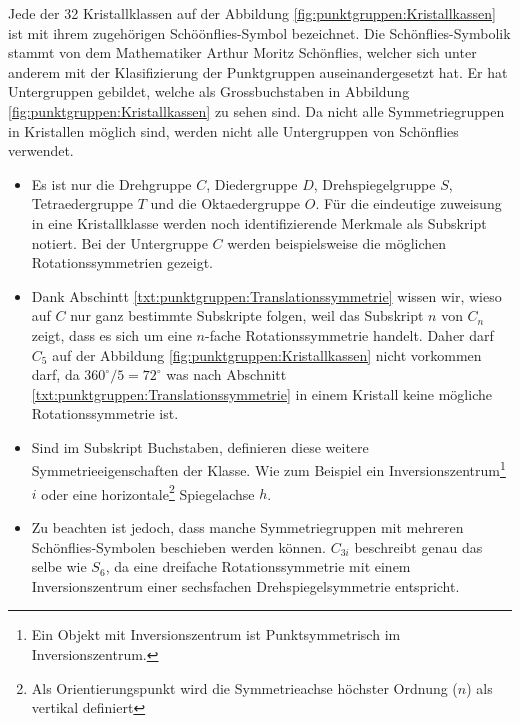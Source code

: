 Jede der 32 Kristallklassen auf der Abbildung \ref{fig:punktgruppen:Kristallkassen} ist mit ihrem zugehörigen Schöönflies-Symbol bezeichnet.
 Die Schönflies-Symbolik stammt von dem Mathematiker Arthur Moritz Schönflies, welcher sich unter anderem mit der Klasifizierung der Punktgruppen auseinandergesetzt hat.
 Er hat Untergruppen gebildet, welche als Grossbuchstaben in Abbildung \ref{fig:punktgruppen:Kristallkassen} zu sehen sind.
 Da nicht alle Symmetriegruppen in Kristallen möglich sind, werden nicht alle Untergruppen von Schönflies verwendet.
 \begin{itemize}
   \item Es ist nur die Drehgruppe \(C\), Diedergruppe \(D\), Drehspiegelgruppe \(S\), Tetraedergruppe \(T\) und die Oktaedergruppe \(O\).
     Für die eindeutige zuweisung in eine Kristallklasse werden noch identifizierende Merkmale als Subskript notiert.
     Bei der Untergruppe \(C\) werden beispielsweise die möglichen Rotationssymmetrien gezeigt.
   \item Dank Abschintt \ref{txt:punktgruppen:Translationssymmetrie} wissen wir, wieso auf \(C\) nur ganz bestimmte Subskripte folgen, weil das Subskript \(n\) von \(C_n\) zeigt, dass es sich um eine \(n\)-fache Rotationssymmetrie handelt.
     Daher darf \(C_5\) auf der Abbildung \ref{fig:punktgruppen:Kristallkassen} nicht vorkommen darf, da \(360^\circ/5 =  72^\circ\) was nach Abschnitt \ref{txt:punktgruppen:Translationssymmetrie} in einem Kristall keine mögliche Rotationssymmetrie ist.
   \item Sind im Subskript Buchstaben, definieren diese weitere Symmetrieeigenschaften der Klasse.
     Wie zum Beispiel ein Inversionszentrum\footnote{Ein Objekt mit Inversionszentrum ist Punktsymmetrisch im Inversionszentrum.} \(i\) oder eine horizontale\footnote{Als Orientierungspunkt wird die Symmetrieachse höchster Ordnung (\(n\)) als vertikal definiert} Spiegelachse \(h\).
   \item Zu beachten ist jedoch, dass manche Symmetriegruppen mit mehreren Schönflies-Symbolen beschieben werden können.
     \(C_{3i}\) beschreibt genau das selbe wie \(S_6\), da eine dreifache Rotationssymmetrie mit einem Inversionszentrum einer sechsfachen Drehspiegelsymmetrie entspricht.
 \end{itemize}




